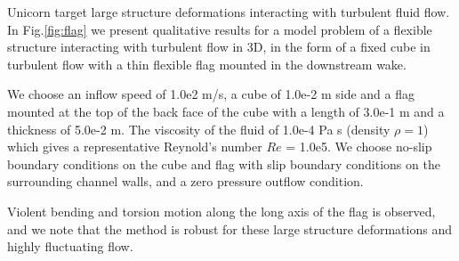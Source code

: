 Unicorn target large structure deformations interacting with turbulent fluid flow. In Fig.\ref{fig:flag} we present qualitative results for a model problem of a flexible structure interacting
with turbulent flow in 3D, in the form of a fixed cube in turbulent flow with a thin flexible flag mounted in the downstream wake.

We choose an inflow speed of 1.0e2 m/s, a cube of 1.0e-2 m side and a flag mounted at the top of the back face of the cube with a length of 3.0e-1 m and a thickness of 5.0e-2 m. The viscosity of the fluid of 1.0e-4 Pa s (density $\rho=1$) which gives a representative Reynold's number $Re$ = 1.0e5. We choose no-slip boundary conditions on the cube and flag with slip boundary conditions on the surrounding channel walls, and a zero pressure outflow condition.

Violent bending and torsion motion along the long axis of the flag is observed, and we note that the
method is robust for these large structure deformations and highly fluctuating flow.

